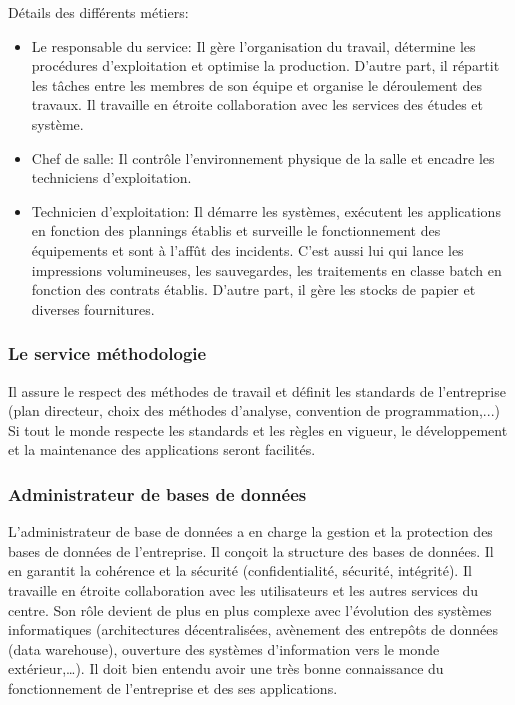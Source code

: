 \documentclass[10pt,a4paper,oneside,titlepage]{report}
\begin{document}
Détails des différents métiers:
\begin{itemize}
\item Le responsable du service: Il gère l’organisation du travail, détermine
les procédures d’exploitation et optimise la production. D'autre part, il
répartit les tâches entre les membres de son équipe et organise le déroulement
des travaux. Il travaille en étroite collaboration avec les services des études
et système.
\item Chef de salle: Il contrôle l’environnement physique de la salle et
encadre les techniciens d’exploitation.
\item Technicien d’exploitation: Il démarre les systèmes, exécutent les
applications en fonction des plannings établis et surveille le fonctionnement
des équipements et sont à l’affût des incidents. C'est aussi lui qui lance les
impressions volumineuses, les sauvegardes, les traitements en classe batch en
fonction des contrats établis. D'autre part, il gère les stocks de papier et
diverses fournitures.
\end{itemize}

\subsubsection{Le service méthodologie}
Il assure le respect des méthodes de travail et définit les standards de
l'entreprise (plan directeur, choix des méthodes d’analyse, convention de
programmation,...)\\

Si tout le monde respecte les standards et les règles en vigueur, le
développement et la maintenance des applications seront facilités.

\subsubsection{Administrateur de bases de données}
L’administrateur de base de données a en charge la gestion et la protection des
bases de données de l’entreprise. Il conçoit la structure des bases de données.
Il en garantit la cohérence et la sécurité (confidentialité, sécurité,
intégrité). Il travaille en étroite collaboration avec les utilisateurs et les
autres services du centre. Son rôle devient de plus en plus complexe avec
l’évolution des systèmes informatiques (architectures décentralisées, avènement
des entrepôts de données (data warehouse), ouverture des systèmes d’information
vers le monde extérieur,\dots). Il doit bien entendu avoir une très bonne
connaissance du fonctionnement de l’entreprise et des ses applications.
\end{document}
